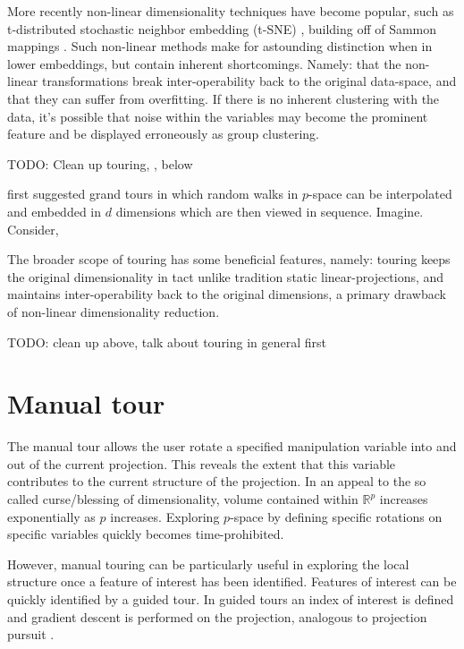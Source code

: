 \documentclass{monashthesis}
\begin{document}
More recently non-linear dimensionality techniques have become popular,
such as t-distributed stochastic neighbor embedding (t-SNE)
\autocite{maaten_visualizing_2008}, building off of Sammon mappings
\autocite{sammon_nonlinear_1969}. Such non-linear methods make for
astounding distinction when in lower embeddings, but contain inherent
shortcomings. Namely: that the non-linear transformations break
inter-operability back to the original data-space, and that they can
suffer from overfitting. If there is no inherent clustering with the
data, it's possible that noise within the variables may become the
prominent feature and be displayed erroneously as group clustering.

TODO: Clean up touring, , below

\autocites{asimov_grand_1985}{buja_grand_1986} first suggested grand
tours in which random walks in \(p\)-space can be interpolated and
embedded in \(d\) dimensions which are then viewed in sequence. Imagine.
Consider,

The broader scope of touring has some beneficial features, namely:
touring keeps the original dimensionality in tact unlike tradition
static linear-projections, and maintains inter-operability back to the
original dimensions, a primary drawback of non-linear dimensionality
reduction.

TODO: clean up above, talk about touring in general first

\section{Manual tour}\label{manual-tour}

The manual tour\autocites{cook_manual_1997}{cook_grand_2008} allows the
user rotate a specified manipulation variable into and out of the
current projection. This reveals the extent that this variable
contributes to the current structure of the projection. In an appeal to
the so called curse/blessing of dimensionality, volume contained within
\(\mathbb{R}^p\) increases exponentially as \(p\) increases. Exploring
\(p\)-space by defining specific rotations on specific variables quickly
becomes time-prohibited.

However, manual touring can be particularly useful in exploring the
local structure once a feature of interest has been identified. Features
of interest can be quickly identified by a guided
tour\autocite{hurley_analyzing_1990}. In guided tours an index of
interest is defined and gradient descent is performed on the projection,
analogous to projection pursuit \autocite{friedman_projection_1974}.
\end{document}
